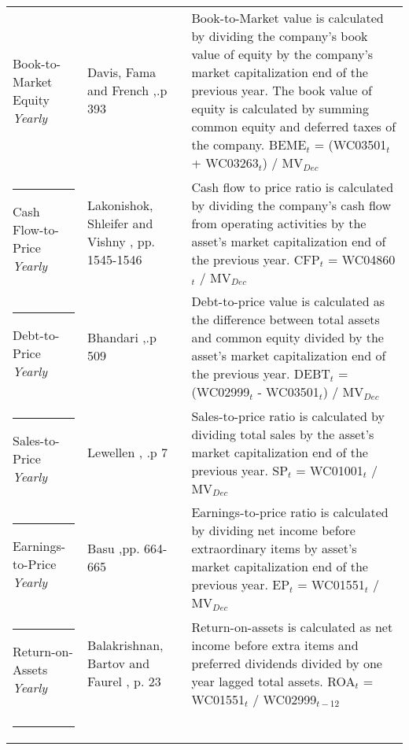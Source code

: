 \documentclass[12pt]{article}
\begin{document}
\begin{appendices}
{{\begin{xltabular}{\textwidth}{ >{\raggedright\arraybackslash}p{0.23\textwidth} >{\raggedright\arraybackslash}p{0.2\textwidth} X}
Book-to-Market Equity \newline \emph{Yearly} 	& Davis, Fama and French \citeyearpar{Davis2000},\newline .p 393	&  Book-to-Market value is calculated by dividing the company's book value of equity by the company's market capitalization end of the previous year. The book value of equity is calculated by summing common equity and deferred taxes of the company. \newline BEME$_t$ = (WC03501$_{t}$ + WC03263$_{t}$) /  MV$_{Dec}$\\ \rule{-1ex}{3ex}
Cash Flow-to-Price \newline \emph{Yearly}	& Lakonishok, Shleifer and Vishny  \citeyearpar{Lakonishok1994}, \newline pp. 1545-1546 & Cash flow to price ratio is calculated by dividing the company's cash flow from operating activities by the asset's market capitalization end of the previous year. \newline CFP$_t$ = WC04860$_{t}$ / MV$_{Dec}$\\ \rule{-1ex}{3ex}
Debt-to-Price \newline \emph{Yearly}			& Bhandari \citeyearpar{Bhandari1988},\newline .p 509				& Debt-to-price value is calculated as the difference between total assets and common equity divided by the asset's market capitalization end of the previous year. \newline DEBT$_t$ = (WC02999$_{t}$ - WC03501$_{t}$) / MV$_{Dec}$\\ \rule{-1ex}{3ex}
Sales-to-Price 	\newline \emph{Yearly}		& Lewellen \citeyearpar{Lewellen2015}, \newline .p 7				& Sales-to-price ratio is calculated by dividing total sales by the asset's market capitalization end of the previous year. \newline SP$_t$ = WC01001$_{t}$ / MV$_{Dec}$ \\ \rule{-1ex}{3ex}
Earnings-to-Price \newline \emph{Yearly}		& Basu \citeyearpar{Basu1977},\newline pp. 664-665				& Earnings-to-price ratio is calculated by dividing net income before extraordinary items by asset's market capitalization end of the previous year. \newline EP$_t$ = WC01551$_{t}$ / MV$_{Dec}$ \\ \rule{-1ex}{3ex}
Return-on-Assets \newline \emph{Yearly}		& Balakrishnan, Bartov and Faurel \citeyearpar{BALAKRISHNAN2010}, p. 23	& Return-on-assets is calculated as net income before extra items and preferred dividends divided by one year lagged total assets. \newline ROA$_t$ = WC01551$_{t}$ / WC02999$_{t-12}$ \\ \rule{-1ex}{3ex}

\end{xltabular}}}
\end{appendices}
\end{document}

